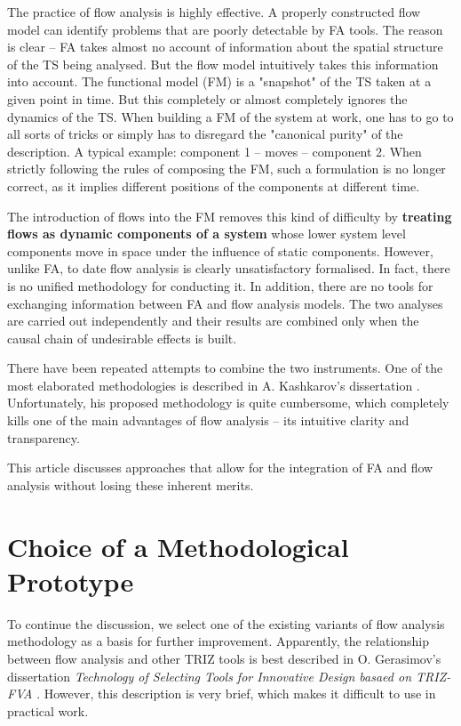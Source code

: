 \documentclass[a4paper,11pt]{article}
\begin{document}
The practice of flow analysis is highly effective. A properly constructed flow
model can identify problems that are poorly detectable by FA tools. The reason
is clear -- FA takes almost no account of information about the spatial
structure of the TS being analysed. But the flow model intuitively takes this
information into account. The functional model (FM) is a "snapshot" of the TS
taken at a given point in time. But this completely or almost completely
ignores the dynamics of the TS. When building a FM of the system at work, one
has to go to all sorts of tricks or simply has to disregard the "canonical
purity" of the description. A typical example: component 1 -- moves --
component 2. When strictly following the rules of composing the FM, such a
formulation is no longer correct, as it implies different positions of the
components at different time.

The introduction of flows into the FM removes this kind of difficulty by
\textbf{treating flows as dynamic components of a system} whose lower system
level components move in space under the influence of static components.
However, unlike FA, to date flow analysis is clearly unsatisfactory
formalised.  In fact, there is no unified methodology for conducting it.  In
addition, there are no tools for exchanging information between FA and flow
analysis models. The two analyses are carried out independently and their
results are combined only when the causal chain of undesirable effects is
built.

There have been repeated attempts to combine the two instruments. One of the
most elaborated methodologies is described in A. Kashkarov's dissertation
\cite{1}.  Unfortunately, his proposed methodology is quite cumbersome, which
completely kills one of the main advantages of flow analysis -- its intuitive
clarity and transparency.

This article discusses approaches that allow for the integration of FA and
flow analysis without losing these inherent merits.

\section*{Choice of a Methodological Prototype}

To continue the discussion, we select one of the existing variants of flow
analysis methodology as a basis for further improvement. Apparently, the
relationship between flow analysis and other TRIZ tools is best described in
O. Gerasimov's dissertation \emph{Technology of Selecting Tools for Innovative
  Design basaed on TRIZ-FVA} \cite{2}. However, this description is very
brief, which makes it difficult to use in practical work.
\end{document}
